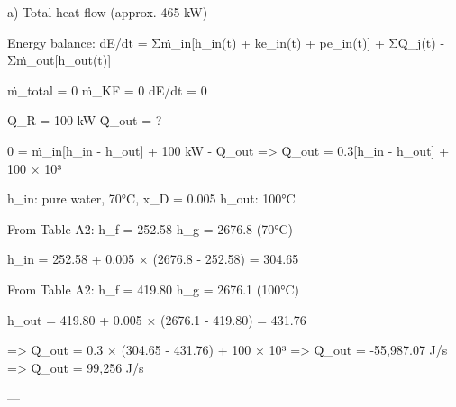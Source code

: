a) Total heat flow (approx. 465 kW)  

Energy balance:  
dE/dt = Σṁ_in[h_in(t) + ke_in(t) + pe_in(t)] + ΣQ̇_j(t) - Σṁ_out[h_out(t)]  

ṁ_total = 0  
ṁ_KF = 0  
dE/dt = 0  

Q̇_R = 100 kW  
Q̇_out = ?  

0 = ṁ_in[h_in - h_out] + 100 kW - Q̇_out  
=> Q̇_out = 0.3[h_in - h_out] + 100 × 10³  

h_in: pure water, 70°C, x_D = 0.005  
h_out: 100°C  

From Table A2:  
h_f = 252.58  
h_g = 2676.8 (70°C)  

h_in = 252.58 + 0.005 × (2676.8 - 252.58) = 304.65  

From Table A2:  
h_f = 419.80  
h_g = 2676.1 (100°C)  

h_out = 419.80 + 0.005 × (2676.1 - 419.80) = 431.76  

=> Q̇_out = 0.3 × (304.65 - 431.76) + 100 × 10³  
=> Q̇_out = -55,987.07 J/s  
=> Q̇_out = 99,256 J/s  

---